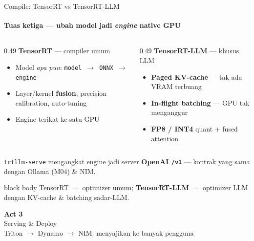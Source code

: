 \documentclass[aspectratio=169,t]{beamer}
\newcommand{\acttitle}[3]{%
  \begin{frame}[plain]
    \vspace{1.5cm}
    \begin{center}
      {\color{nvgreen}\Huge\bfseries Act #1}\\[1.2em]
      {\color{nvwhite}\Huge #2}\\[0.8em]
      {\color{nvgray}\Large #3}
    \end{center}
  \end{frame}%
}
\newcommand{\takeaway}[1]{%
  \vspace{0.3em}
  \begin{beamercolorbox}[rounded=true,shadow=false,sep=6pt]{block body}
    \centering\small\color{nvlightgreen}#1
  \end{beamercolorbox}%
}
\begin{document}
\begin{frame}{Compile: TensorRT vs TensorRT-LLM}
  \framesubtitle{Tuas ketiga --- ubah model jadi \emph{engine} native GPU}
  \begin{columns}[T]
    \begin{column}{0.49\textwidth}
      \textcolor{nvgreen}{\textbf{TensorRT}} --- compiler umum
      \begin{itemize}\footnotesize
        \item Model \emph{apa pun}: \texttt{model $\to$ ONNX $\to$ engine}
        \item Layer/kernel \textbf{fusion}, precision calibration, auto-tuning
        \item Engine terikat ke satu GPU
      \end{itemize}
    \end{column}
    \begin{column}{0.49\textwidth}
      \textcolor{nvorange}{\textbf{TensorRT-LLM}} --- khusus LLM
      \begin{itemize}\footnotesize
        \item \textbf{Paged KV-cache} --- tak ada VRAM terbuang
        \item \textbf{In-flight batching} --- GPU tak menganggur
        \item \textbf{FP8 / INT4} quant + fused attention
      \end{itemize}
    \end{column}
  \end{columns}
  \vspace{0.2em}
  \begin{center}\textcolor{nvgray}{\scriptsize \texttt{trtllm-serve} mengangkat engine jadi server \textbf{OpenAI \texttt{/v1}} --- kontrak yang sama dengan Ollama (M04) \& NIM.}\end{center}
  \takeaway{TensorRT $=$ optimizer umum; \textbf{TensorRT-LLM} $=$ optimizer LLM dengan KV-cache \& batching sadar-LLM.}
\end{frame}

\acttitle{3}{Serving \& Deploy}{Triton $\to$ Dynamo $\to$ NIM: menyajikan ke banyak pengguna}
\end{document}
